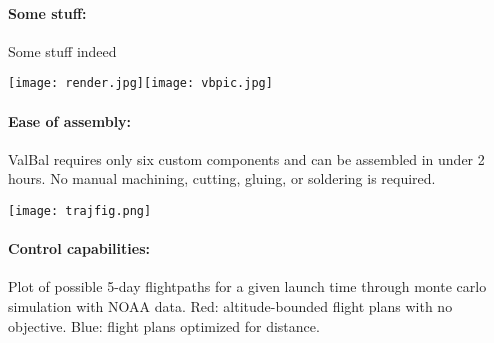 \documentclass[12pt, twocolumn]{article}
\begin{document}
{\footnotesize 

\paragraph{\sffamily Some stuff:} Some stuff indeed \Blindtext[1][3]


\begin{minipage}{\linewidth}
\vspace*{\fill}
\begin{center}\texttt{[image: render.jpg]}\texttt{[image: vbpic.jpg]}\end{center}
\paragraph{\sffamily Ease of assembly:} ValBal requires only six custom components and can be assembled in under 2 hours. No manual machining, cutting, gluing, or soldering is required.

\begin{center}\texttt{[image: trajfig.png]}\end{center}
\paragraph{\sffamily Control capabilities:} Plot of possible 5-day flightpaths for a given launch time through monte carlo simulation with NOAA data. Red: altitude-bounded flight plans with no objective. Blue: flight plans optimized for distance.
\end{minipage}
}
\end{document}
